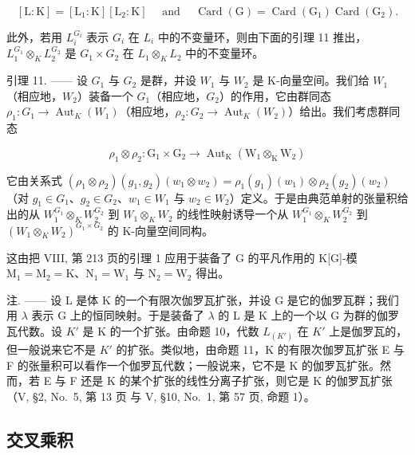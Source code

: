 \[
[ \mathrm{L}: \mathrm{K} ] = [ \mathrm{L} _ {1}: \mathrm{K} ] [ \mathrm{L} _ {2}: \mathrm{K} ] \quad \text { and } \quad \operatorname{Card} (\mathrm{G}) = \operatorname{Card} (\mathrm{G} _ {1})   \operatorname{Card} (\mathrm{G} _ {2}).
\]

此外，若用 \(L_{i}^{G_{i}}\) 表示 \(G_{i}\) 在 \(L_{i}\) 中的不变量环，则由下面的引理 11 推出，\(L_{1}^{G_{1}} \otimes_{K} L_{2}^{G_{2}}\) 是 \(G_{1} \times G_{2}\) 在 \(L_{1} \otimes_{K} L_{2}\) 中的不变量环。

引理 11. —— 设 \(G_{1}\) 与 \(G_{2}\) 是群，并设 \(W_{1}\) 与 \(W_{2}\) 是 K-向量空间。我们给 \(W_{1}\)（相应地，\(W_{2}\)）装备一个 \(G_{1}\)（相应地，\(G_{2}\)）的作用，它由群同态 \(\rho_{1}: G_{1} \to \operatorname{Aut}_{K}(W_{1})\)（相应地，\(\rho_{2}: G_{2} \to \operatorname{Aut}_{K}(W_{2})\)）给出。我们考虑群同态

\[
\rho_ {1} \otimes \rho_ {2}: \mathrm{G} _ {1} \times \mathrm{G} _ {2} \longrightarrow \operatorname{Aut} _ {\mathrm{K}} (\mathrm{W} _ {1} \otimes_ {\mathrm{K}} \mathrm{W} _ {2})
\]

它由关系式 \((\rho_{1}\otimes\rho_{2})(g_{1},g_{2})(w_{1}\otimes w_{2})=\rho_{1}(g_{1})(w_{1})\otimes\rho_{2}(g_{2})(w_{2})\)（对 \(g_{1}\in G_{1}\)、\(g_{2}\in G_{2}\)、\(w_{1}\in W_{1}\) 与 \(w_{2}\in W_{2}\)）定义。于是由典范单射的张量积给出的从 \(W_{1}^{G_{1}}\otimes_{K}W_{2}^{G_{2}}\) 到 \(W_{1}\otimes_{K}W_{2}\) 的线性映射诱导一个从 \(W_{1}^{G_{1}}\otimes_{K}W_{2}^{G_{2}}\) 到 \((W_{1}\otimes_{K}W_{2})^{G_{1}\times G_{2}}\) 的 K-向量空间同构。

这由把 VIII, 第 213 页的引理 1 应用于装备了 G 的平凡作用的 K{[}G{]}-模 \(\mathrm{M}_1 = \mathrm{M}_2 = \mathrm{K}\)、\(\mathrm{N}_1 = \mathrm{W}_1\) 与 \(\mathrm{N}_2 = \mathrm{W}_2\) 得出。

注. —— 设 L 是体 K 的一个有限次伽罗瓦扩张，并设 G 是它的伽罗瓦群；我们用 \(\lambda\) 表示 G 上的恒同映射。于是装备了 \(\lambda\) 的 L 是 K 上的一个以 G 为群的伽罗瓦代数。设 \(K'\) 是 K 的一个扩张。由命题 10，代数 \(L_{(K')}\) 在 \(K'\) 上是伽罗瓦的，但一般说来它不是 \(K'\) 的扩张。类似地，由命题 11，K 的有限次伽罗瓦扩张 E 与 F 的张量积可以看作一个伽罗瓦代数；一般说来，它不是 K 的伽罗瓦扩张。然而，若 E 与 F 还是 K 的某个扩张的线性分离子扩张，则它是 K 的伽罗瓦扩张（V, §2, No.~5, 第 13 页 与 V, §10, No.~1, 第 57 页, 命题 1）。

\subsection{交叉乘积}

